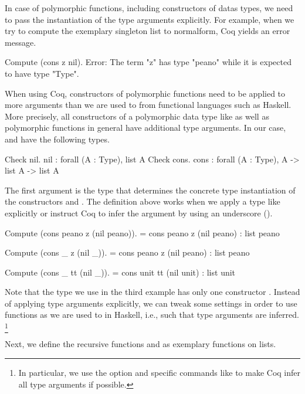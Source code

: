 In case of polymorphic functions, including constructors of datas types, we need to pass the instantiation of the type arguments explicitly.
For example, when we try to compute the exemplary singleton list  to normalform, Coq yields an error message.

\begin{crepl}
\coqrepl Compute (cons z nil).
Error: The term "z" has type "peano" while it is expected to have type
       "Type".
\end{crepl}

When using Coq, constructors of polymorphic functions need to be applied to more arguments than we are used to from functional languages such as Haskell.
More precisely, all constructors of a polymorphic data type like  as well as polymorphic functions in general have additional type arguments.
In our case,  and  have the following types.

\begin{crepl}
\coqrepl Check nil.
   nil : forall (A : Type), list A
\coqrepl Check cons.
   cons : forall (A : Type), A -> list A -> list A
\end{crepl}

The first argument is the type that determines the concrete type instantiation of the constructors  and .
The definition above works when we apply a type like  explicitly or instruct Coq to infer the argument by using an underscore (\cinl{_}).

\begin{crepl}
\coqrepl Compute (cons peano z (nil peano)).
    = cons peano z (nil peano)
    : list peano

\coqrepl Compute (cons _ z (nil _)).
    = cons peano z (nil peano)
    : list peano

\coqrepl Compute (cons _ tt (nil _)).
    = cons unit tt (nil unit)
    : list unit
\end{crepl}

Note that the type  we use in the third example has only one constructor .
Instead of applying type arguments explicitly, we can tweak some settings in order to use functions as we are used to in Haskell, i.e., such that type arguments are inferred. \footnote{In particular, we use the option  and specific commands like  to make Coq infer all type arguments if possible.}

Next, we define the recursive functions  and  as exemplary functions on lists.

